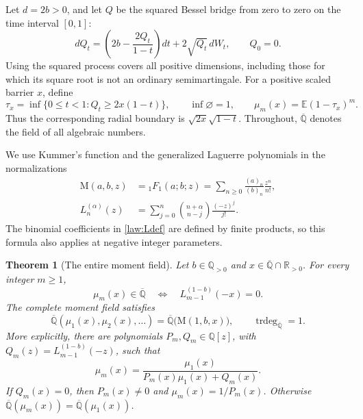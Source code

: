\documentclass[11pt,a4paper]{article}
\newcommand{\Q}{\mathbb Q}
\newcommand{\Qbar}{\overline{\mathbb Q}}
\newcommand{\M}{\mathrm M}
\DeclareMathOperator{\trdeg}{trdeg}
\newtheorem{theorem}{Theorem}[section]
\theoremstyle{definition}
\theoremstyle{remark}
\numberwithin{equation}{section}
\begin{document}
Let $d=2b>0$, and let $Q$ be the squared Bessel bridge from zero to
zero on the time interval $[0,1]$:
\begin{equation}\label{law:bridge}
 dQ_t=\left(2b-\frac{2Q_t}{1-t}\right)dt
       +2\sqrt{Q_t}\,dW_t,\qquad Q_0=0.
\end{equation}
Using the squared process covers all positive dimensions, including
those for which its square root is not an ordinary semimartingale.
For a positive scaled barrier $x$, define
\begin{equation}\label{law:stopping}
 \tau_x=\inf\{0\leq t<1:Q_t\geq2x(1-t)\},
 \qquad \inf\varnothing=1,
 \qquad \mu_m(x)=\mathbb{E}(1-\tau_x)^m.
\end{equation}
Thus the corresponding radial boundary is $\sqrt{2x}\sqrt{1-t}$.
Throughout, $\Qbar$ denotes the field of all algebraic numbers.

We use Kummer's function and the generalized Laguerre polynomials in
the normalizations
\begin{align}
 \M(a,b,z)&={}_1F_1(a;b;z)
   =\sum_{n\geq0}\frac{(a)_n}{(b)_n}\frac{z^n}{n!},
   \label{law:Mdef}\\
 L_n^{(\alpha)}(z)&=
   \sum_{j=0}^n\binom{n+\alpha}{n-j}\frac{(-z)^j}{j!}.
   \label{law:Ldef}
\end{align}
The binomial coefficients in \eqref{law:Ldef} are defined by finite
products, so this formula also applies at negative integer parameters.

\begin{theorem}[The entire moment field]\label{law:mainmoments}
Let $b\in\Q_{>0}$ and $x\in\Qbar\cap\mathbb R_{>0}$.
For every integer $m\geq1$,
\begin{equation}\label{law:momentclassification}
 \mu_m(x)\in\Qbar
 \quad\Longleftrightarrow\quad
 L_{m-1}^{(1-b)}(-x)=0.
\end{equation}
The complete moment field satisfies
\begin{equation}\label{law:momentfield}
 \Qbar(\mu_1(x),\mu_2(x),\ldots)
 =\Qbar\bigl(\M(1,b,x)\bigr),
 \qquad \trdeg_{\Qbar}=1.
\end{equation}
More explicitly, there are polynomials $P_m,Q_m\in\Q[z]$, with
$Q_m(z)=L_{m-1}^{(1-b)}(-z)$, such that
\begin{equation}\label{law:fractionalrelation}
 \mu_m(x)=\frac{\mu_1(x)}{P_m(x)\mu_1(x)+Q_m(x)}.
\end{equation}
If $Q_m(x)=0$, then $P_m(x)\ne0$ and $\mu_m(x)=1/P_m(x)$.
Otherwise $\Qbar(\mu_m(x))=\Qbar(\mu_1(x))$.
\end{theorem}
\end{document}
